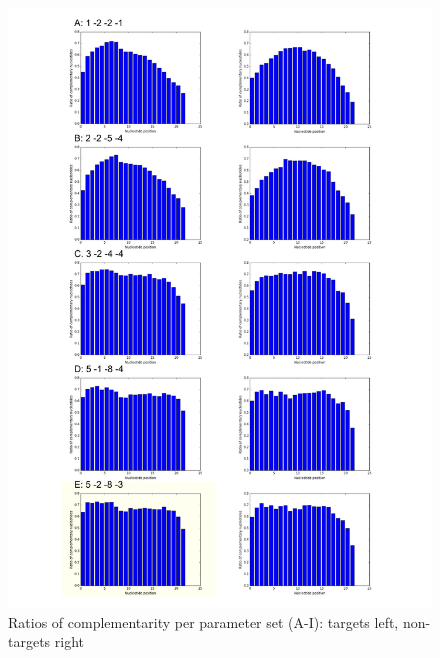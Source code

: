 \documentclass[11pt, a4paper, twoside]{book}
\begin{document}
\begin{figure}
\vspace{-1cm}
\hspace{-1.2cm}
\includegraphics[scale=0.72]{results/compl1.pdf}
\caption{Ratios of complementarity per parameter set (A-I): targets left, non-targets right}
\label{ratios}
\end{figure}
\end{document}
